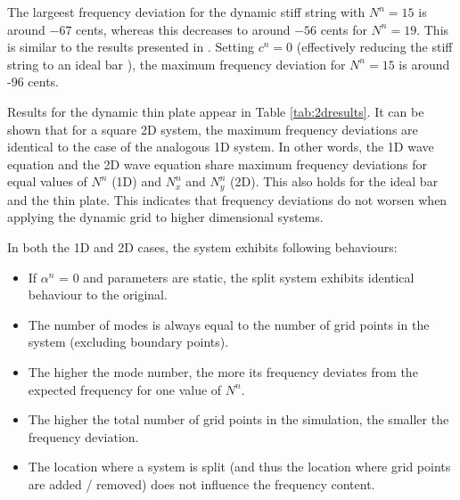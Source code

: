 \documentclass[fleqn]{jaes}
\def\SWcomment[#1]{\textcolor{blue}{#1}}
\begin{document}
%
%
The largeest frequency deviation for the dynamic stiff string with $N^n = 15$ is around $-67$ cents, whereas this decreases to around $-56$ cents for $N^n = 19$. This is similar to the results presented in \cite{Willemsen2021a}. Setting $c^n=0$ (effectively reducing the stiff string to an ideal bar \cite{Bilbao2009}), the maximum frequency deviation for $N^n=15$ is around -96 cents. 

Results for the dynamic thin plate appear in Table \ref{tab:2dresults}. It can be shown that for a square 2D system, the maximum frequency deviations are identical to the case of the analogous 1D system. In other words, the 1D wave equation and the 2D wave equation share maximum frequency deviations for equal values of $N^n$ (1D) and $N_x^n$ and $N_y^n$ (2D). This also holds for the ideal bar and the thin plate. This indicates that frequency deviations do not worsen when applying the dynamic grid to higher dimensional systems.%

In both the 1D and 2D cases, the system exhibits following behaviours:
\vspace{-1em}\begin{itemize}
    \item If $\alpha^n$ = 0 and parameters are static, the split system exhibits identical behaviour to the original. 
    \item The number of modes is always equal to the number of grid points in the system (excluding boundary points).
    \item The higher the mode number, the more its frequency deviates from the expected frequency for one value of $N^n$.
    \item The higher the total number of grid points in the simulation, the smaller the frequency deviation.
    \item The location where a system is split (and thus the location where grid points are added / removed) does not influence the frequency content. 
\end{itemize}
\vspace{-1em}
\end{document}
